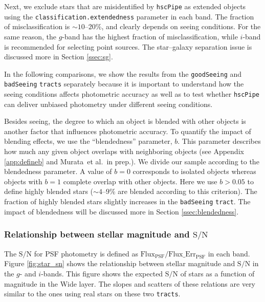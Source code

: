 \documentclass[useamsfonts]{pasj01}
\def\etal{{\ et al.~}}
\def\hscpipe{\texttt{hscPipe}}
\def\tract{\texttt{tract}}
\def\tracts{\texttt{tracts}}
\def\s2n{{$\mathrm{S}/\mathrm{N}$}}
\begin{document}
    Next, we exclude stars that are misidentified by \hscpipe{} as extended
    objects using the \texttt{classification.extendedness} parameter in each band.
    The fraction of misclassification is ${\sim}10$--$20$\%, and clearly depends on
    seeing conditions.
    For the same reason, the $g$-band has the highest fraction of misclassification,
    while $i$-band is recommended for selecting point sources.
    The star--galaxy separation issue is discussed more in Section \ref{ssec:sg}.

    In the following comparisons, we show the results from the
    \texttt{goodSeeing} and \texttt{badSeeing} \tracts{} separately because it
    is important to understand how the seeing conditions affects photometric accuracy 
    as well as to test whether \hscpipe{} can deliver unbiased photometry under 
    different seeing conditions.
    
    Besides seeing, the degree to which an object is blended with other objects 
    is another factor that influences photometric accuracy. 
    To quantify the impact of blending effects, we use the ``blendedness'' 
    parameter, $b$. 
    This parameter describes how much any given object overlaps with neighboring 
    objects (see Appendix \ref{app:defineb} and Murata\etal in prep.). 
    We divide our sample according to the blendedness parameter. 
    A value of $b=0$ corresponds to isolated objects whereas objects with $b=1$ 
    complete overlap with other objects. 
    Here we use $b>0.05$ to define highly blended stars (${\sim}4$--$9$\% are blended
    according to this criterion).
    The fraction of highly blended stars slightly increases in the \texttt{badSeeing} 
    \tract{}. 
    The impact of blendedness will be discussed more in Section \ref{ssec:blendedness}.

\subsubsection{Relationship between stellar magnitude and \s2n{}}

    The \s2n{} for PSF photometry is defined as
    $\mathrm{Flux}_{\mathrm{PSF}}/\mathrm{Flux\_Err}_{\mathrm{PSF}}$ in each band. 
    Figure \ref{fig:star_sn} shows the relationship between stellar magnitude and \s2n{} 
    in the $g$- and $i$-bands. 
    This figure shows the expected \s2n{} of stars as a function of magnitude in the 
    Wide layer.
    The slopes and scatters of these relations are very similar to the ones using 
    real stars on these two \tracts{}.
    
\end{document}
